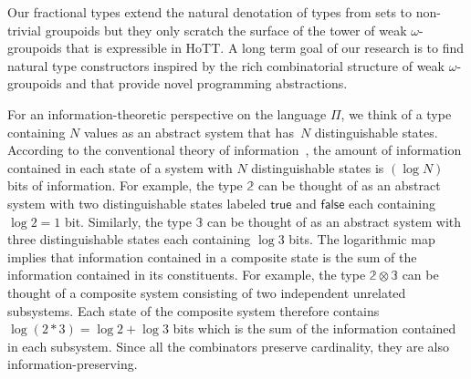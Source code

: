 \documentclass[a4paper,USenglish]{lipics-v2016-utf8x}
\begin{document}
Our fractional types extend the natural denotation of types from sets
to non-trivial groupoids but they only scratch the surface of the
tower of weak $\omega$-groupoids that is expressible in HoTT. A long
term goal of our research is to find natural type constructors
inspired by the rich combinatorial structure of weak
$\omega$-groupoids and that provide novel programming abstractions.

For an information-theoretic perspective on the language $\Pi$, we think of a
type containing $N$ values as an abstract system that has~$N$ distinguishable
states. According to the conventional theory of information~\cite{Shannon1948},
the amount of information contained in each state of a system with $N$
distinguishable states is $(\log N)$ bits of information. For example, the type
$\mathbb{2}$ can be thought of as an abstract system with two distinguishable
states labeled $\mathsf{true}$ and $\mathsf{false}$ each containing $\log 2 = 1$
bit. Similarly, the type $\mathbb{3}$ can be thought of as an abstract system
with three distinguishable states each containing $\log 3$ bits. The logarithmic
map implies that information contained in a composite state is the sum of the
information contained in its constituents. For example, the type $\mathbb{2}
\otimes \mathbb{3}$ can be thought of a composite system consisting of two
independent unrelated subsystems. Each state of the composite system therefore
contains $\log (2 * 3) = \log 2 + \log 3$ bits which is the sum of the
information contained in each subsystem. Since all the combinators preserve
cardinality, they are also information-preserving.



\end{document}
